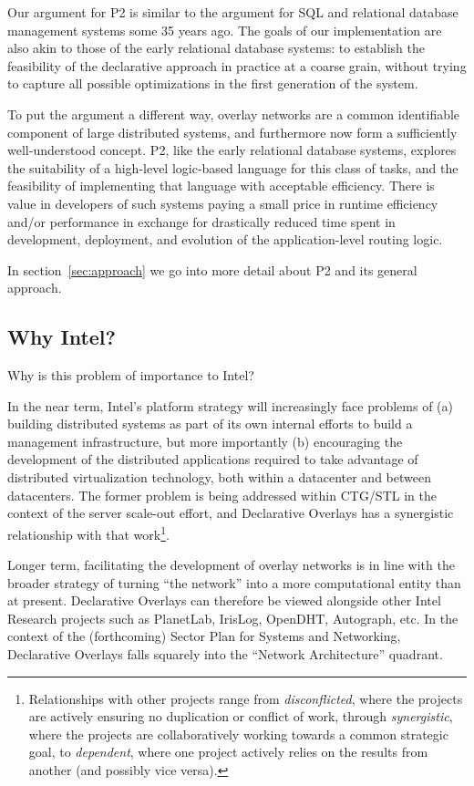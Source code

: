 \documentclass[twocolumn,10pt]{article}
\def\Sys{P2\xspace}
\def\Lrp{Declarative Overlays\xspace}
\begin{document}
Our argument for \Sys is similar to the argument for SQL and
relational database management systems some 35 years ago.  The goals of
our implementation are also akin to those of the early relational
database systems: to establish the feasibility of the declarative
approach in practice at a coarse grain, without trying to capture all
possible optimizations in the first generation of the system.

To put the argument a different way, 
overlay networks are a common identifiable component of large
distributed systems, and furthermore now form a sufficiently
well-understood concept.  \Sys, like the early relational database
systems, explores the suitability of a high-level logic-based language
for this class of tasks, and the feasibility of implementing that
language with acceptable efficiency.  There is value in developers of
such systems paying a small price in runtime efficiency and/or
performance in exchange for drastically reduced time spent in
development, deployment, and evolution of the application-level
routing logic. 

In section~\ref{sec:approach}  we go into more detail about \Sys and
its general approach. 

\subsection{Why Intel?}

Why is this problem of importance to Intel? 

In the near term, Intel's platform strategy will increasingly face
problems of (a) building distributed systems as part of its own
internal efforts to build a management infrastructure, but more
importantly (b) encouraging the development of the distributed
applications required to take advantage of distributed virtualization
technology, both within a datacenter and between datacenters.   The
former problem is being addressed within CTG/STL in the context of the
server scale-out effort, and \Lrp has a synergistic relationship with
that work\footnote{Relationships with other projects range from 
\emph{disconflicted}, where the projects are actively ensuring no 
duplication or conflict of work, through \emph{synergistic}, where the
projects are collaboratively working towards a common strategic goal,
to \emph{dependent}, where one project actively relies on the results
from another (and possibly vice versa).}. 

Longer term, facilitating the development of overlay networks is in
line with the broader strategy of turning ``the network'' into a more
computational entity than at present.  \Lrp can therefore be viewed
alongside other Intel Research projects such as PlanetLab, IrisLog,
OpenDHT, Autograph, etc.  In the context of the (forthcoming) Sector
Plan for Systems and Networking, \Lrp falls squarely into the
``Network Architecture'' quadrant. 
\end{document}
